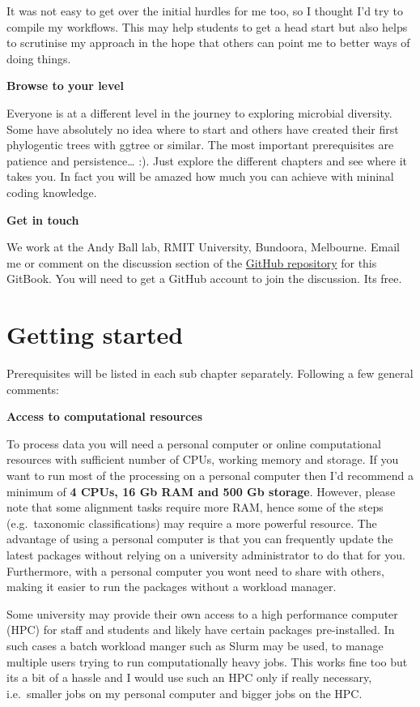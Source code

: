 \documentclass[
]{book}
\begin{document}
It was not easy to get over the initial hurdles for me too, so I thought I'd try to compile my workflows. This may help students to get a head start but also helps to scrutinise my approach in the hope that others can point me to better ways of doing things.

\textbf{Browse to your level}

Everyone is at a different level in the journey to exploring microbial diversity. Some have absolutely no idea where to start and others have created their first phylogentic trees with ggtree or similar. The most important prerequisites are patience and persistence\ldots{} :). Just explore the different chapters and see where it takes you. In fact you will be amazed how much you can achieve with mininal coding knowledge.

\textbf{Get in touch}

We work at the Andy Ball lab, RMIT University, Bundoora, Melbourne. Email me or comment on the discussion section of the \href{https://github.com/chrismitbiz/ABlab-workflows/discussions/}{GitHub repository} for this GitBook. You will need to get a GitHub account to join the discussion. Its free.

\hypertarget{gettingstarted}{%
\chapter{Getting started}\label{gettingstarted}}

Prerequisites will be listed in each sub chapter separately.
Following a few general comments:

\textbf{Access to computational resources}

To process data you will need a personal computer or online computational resources with sufficient number of CPUs, working memory and storage. If you want to run most of the processing on a personal computer then I'd recommend a minimum of \textbf{4 CPUs, 16 Gb RAM and 500 Gb storage}. However, please note that some alignment tasks require more RAM, hence some of the steps (e.g.~taxonomic classifications) may require a more powerful resource. The advantage of using a personal computer is that you can frequently update the latest packages without relying on a university administrator to do that for you. Furthermore, with a personal computer you wont need to share with others, making it easier to run the packages without a workload manager.

Some university may provide their own access to a high performance computer (HPC) for staff and students and likely have certain packages pre-installed. In such cases a batch workload manger such as Slurm may be used, to manage multiple users trying to run computationally heavy jobs. This works fine too but its a bit of a hassle and I would use such an HPC only if really necessary, i.e.~smaller jobs on my personal computer and bigger jobs on the HPC.
\end{document}
